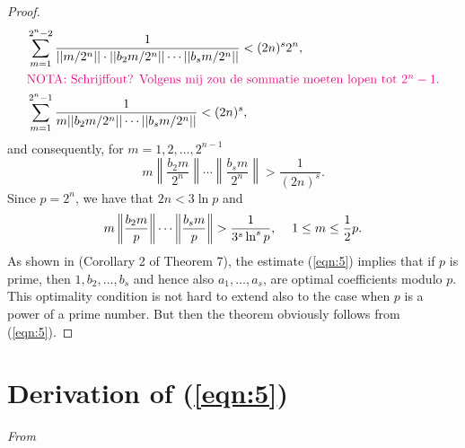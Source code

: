 \documentclass[a4paper, 12pt]{article}
\begin{document}
\begin{proof}
\begin{align*}
&\sum_{m=1}^{2^n-2}\frac{1}{||m/2^n||\cdot||b_2m/2^n|| \cdots ||b_sm/2^n||} < (2n)^s2^n,\\
&\mbox{\comm{NOTA: Schrijffout? Volgens mij zou de sommatie moeten lopen tot $2^n-1$.}} \\
&\sum_{m=1}^{2^n-1}\frac{1}{m||b_2m/2^n|| \cdots ||b_sm/2^n||} < (2n)^s,
\end{align*}
and consequently, for $m=1,2,\dots,2^{n-1}$
\begin{equation*}
m\left\|\frac{b_2m}{2^n}\right\| \cdots \left\|\frac{b_sm}{2^n}\right\|>\frac{1}{(2n)^s}.
\end{equation*}
Since $p=2^n$, we have that $2n<3\ln{p}$ and
\begin{equation}
\label{eqn:5}
m\left\|\frac{b_2m}{p}\right\| \cdots \left\|\frac{b_sm}{p}\right\|>\frac{1}{3^s\ln^s{p}}, \mbox{\hspace{12pt}}1\le m\le\frac{1}{2}p.
\end{equation}
As shown in \cite{korobov1967} (Corollary 2 of Theorem 7), the estimate (\ref{eqn:5}) implies that if $p$ is prime, then $1,b_2,\dots,b_s$ and hence also $a_1,\dots,a_s$, are optimal coefficients modulo $p$. This optimality condition is not hard to extend also to the case when $p$ is a power of a prime number. But then the theorem obviously follows from (\ref{eqn:5}).
\end{proof}

\section*{Derivation of (\ref{eqn:5})}
\emph{From \cite{korobov1967}}



\end{document}

